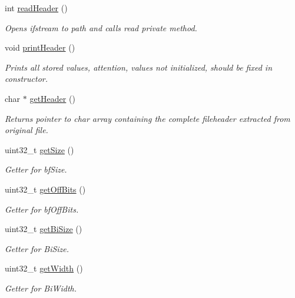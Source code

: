 \begin{DoxyCompactItemize}
int \mbox{\hyperlink{classBitmapHeader_a66adc11592dc1d18edbd46bade1db242}{read\+Header}} ()
\begin{DoxyCompactList}\small\item\em Opens ifstream to path and calls read private method. \end{DoxyCompactList}\item 
void \mbox{\hyperlink{classBitmapHeader_a72e26bdf3269d382dfbdc76119c1a6aa}{print\+Header}} ()
\begin{DoxyCompactList}\small\item\em Prints all stored values, attention, values not initialized, should be fixed in constructor. \end{DoxyCompactList}\item 
char $\ast$ \mbox{\hyperlink{classBitmapHeader_aa29e1acc8a7a588867039d7c0bdcde04}{get\+Header}} ()
\begin{DoxyCompactList}\small\item\em Returns pointer to char array containing the complete fileheader extracted from original file. \end{DoxyCompactList}\item 
uint32\+\_\+t \mbox{\hyperlink{classBitmapHeader_a53309aa035484da90e8170f9950aa86b}{get\+Size}} ()
\begin{DoxyCompactList}\small\item\em Getter for bf\+Size. \end{DoxyCompactList}\item 
uint32\+\_\+t \mbox{\hyperlink{classBitmapHeader_a70702e4d8aba2a3502f776f73bfecde8}{get\+Off\+Bits}} ()
\begin{DoxyCompactList}\small\item\em Getter for bf\+Off\+Bits. \end{DoxyCompactList}\item 
uint32\+\_\+t \mbox{\hyperlink{classBitmapHeader_acce4b6292e2aaf5dbd4bc10687c4fb65}{get\+Bi\+Size}} ()
\begin{DoxyCompactList}\small\item\em Getter for Bi\+Size. \end{DoxyCompactList}\item 
uint32\+\_\+t \mbox{\hyperlink{classBitmapHeader_af1d36ee9f3315866f05c39c2f4871e09}{get\+Width}} ()
\begin{DoxyCompactList}\small\item\em Getter for Bi\+Width. \end{DoxyCompactList}\item 

\end{DoxyCompactItemize}
